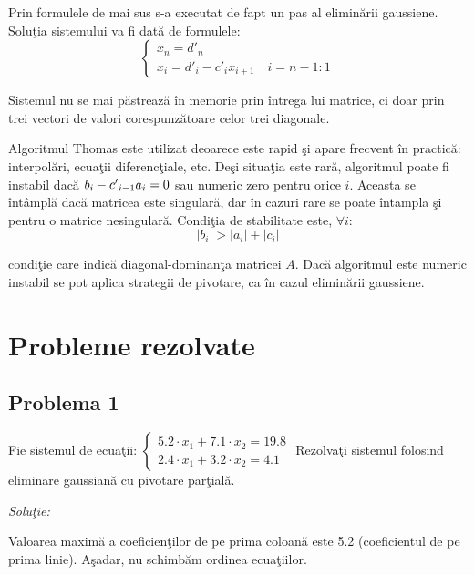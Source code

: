 \documentclass{exam}
\begin{document}
Prin formulele de mai sus s-a executat de fapt un pas al elimin\u{a}rii gaussiene. Solu\c{t}ia sistemului va fi dat\u{a} de formulele:
$$\begin{cases}
		x_n = d'_n \\
		x_i = d'_i - c'_i x_{i + 1} \quad i=n-1:1
	\end{cases}$$

\par Sistemul nu se mai p\u{a}streaz\u{a} \^{i}n memorie prin \^{i}ntrega lui matrice, ci doar prin trei vectori de valori corespunz\u{a}toare celor trei diagonale.

\par Algoritmul Thomas este utilizat deoarece este rapid \c{s}i apare frecvent \^{i}n practic\u{a}: interpol\u{a}ri, ecua\c{t}ii diferenc\c{t}iale, etc. De\c{s}i situa\c{t}ia este rar\u{a}, algoritmul poate fi instabil dac\u{a} $b_i - c\rq{}_{i-1} a_i = 0$ sau numeric zero pentru orice $i$. Aceasta se \^{i}nt\^{a}mpl\u{a} dac\u{a} matricea este singular\u{a}, dar \^{i}n cazuri rare se poate \^{i}ntampla \c{s}i pentru o matrice nesingular\u{a}. Condi\c{t}ia de stabilitate este, $\forall i$:
$$|b_i| > |a_i| + |c_i|$$

\noindent condi\c{t}ie care indic\u{a} diagonal-dominan\c{t}a matricei $A$. Dac\u{a} algoritmul este numeric instabil se pot aplica strategii de pivotare, ca \^{i}n cazul elimin\u{a}rii gaussiene.


\section{Probleme rezolvate}

\subsection{Problema 1}

Fie sistemul de ecua\c{t}ii:
$\displaystyle \begin{cases}
		5.2 \cdot x_1 + 7.1 \cdot x_2 = 19.8 \\
		2.4 \cdot x_1 + 3.2\cdot x_2 = 4.1
	\end{cases}$ Rezolva\c{t}i sistemul folosind eliminare gaussian\u{a} cu pivotare par\c{t}ial\u{a}.

\textit{Soluţie:}

Valoarea maxim\u{a} a coeficien\c{t}ilor de pe prima coloan\u{a} este 5.2 (coeficientul de pe prima linie). A\c{s}adar, nu schimb\u{a}m ordinea ecua\c{t}iilor.\\
\end{document}

